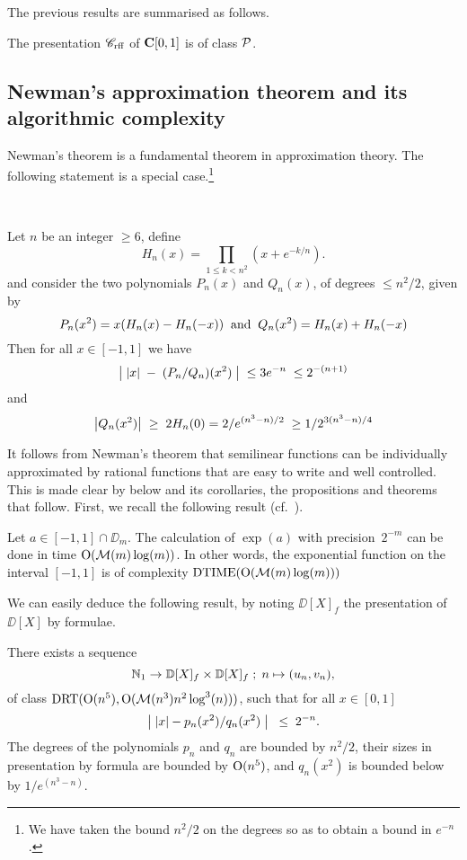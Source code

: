 The previous results are summarised as follows.

\begin{theorem} \label{329}
The presentation ${{{\mathscr C}}_{\rm rff}}$ of ${{\bf C}[0,1]}$ is of class ${\cal P}$.
\end{theorem}

\subsection{Newman's approximation theorem and its algorithmic complexity}\label{subsec33}

Newman's theorem is a fundamental theorem in approximation theory. The following statement is a special case.\footnote{We have taken the bound $n^2/2$ on the degrees so as to obtain a bound in $e^{-n}$.}

\begin{theorem} \label{331}~

\noindent Let $n$ be an integer $\geq 6$, define
\[
H_n(x) = \prod_{ 1 \leq k < n^2}(x + e^{-k/n}).
\]
and consider the two polynomials $P_n(x)$ and $Q_n(x)$, of degrees  $\leq n^2/2$, given by
\[
P_n(x^2) = x(H_n(x) - H_n(-x)) \; \; {\rm and } \; \; Q_n(x^2) = H_n(x) + H_n(-x)
\]
Then for all $x \in [-1,1]$ we have 
\[
\big|{ \; \left|{x}\right|\; - \;(P_n/Q_n)(x^2) \; }\big| \; \leq 3e^{-n}\; \leq 2^{-(n+1)}
\]
and 
\[
\big|{Q_n(x^2)}\big|\; \geq \;2H_n(0) = 2/e^{(n^3 - n)/2} \;\geq 1/2^{3(n^3 - 
n)/4} 
\]
\end{theorem}

It follows from Newman's theorem that semilinear functions can be individually approximated by rational functions that are easy to write and well controlled. This is made clear by  below and its corollaries, the propositions and theorems that follow. First, we recall the following result (cf.\ \cite{Brent}).

\begin{lemma} \label{332} 
 Let $a \in [-1,1]\cap \DD_m$. The calculation of $\exp(a)$ with precision~$2^{-m}$ can be done in time ${\rm O}({{\cal M}}(m)\log(m))$.  
In other words, the exponential function on the interval $[-1,1]$ is of complexity ${\rm DTIME}({\rm O}({{\cal M}}(m)\log(m)))$ 
\end{lemma}

We can easily deduce the following result, by noting $\DD[X]_f$ the presentation of $\DD[X]$ by formulae.

\begin{lemma} \label{333}
There exists a sequence 
\[
\mathbb {N}_1 \rightarrow \mathbb {D}[X]_f \times \mathbb {D}[X]_f \; ; \; n \mapsto (u_n, v_n),
\] 
 of class ${\rm DRT}({\rm O}(n^5), {\rm O}({{{\cal M}}}(n^3) n^2 \log^3(n)))$, such that for all $x \in [0,1]$ 
\[
\left|{\;\left|{x}\right| - p_n(x^2)/q_n(x^2) \;}\right| \;\;\leq \;2^{-n}.
\]
The degrees of the polynomials $p_n$ and $q_n$ are bounded by $n^2/2$, their sizes in presentation by formula are bounded by ${\rm O}(n^5)$, and $q_n(x^2)$ is bounded below by $1/e^{(n^3-n)}$.
\end{lemma} 

